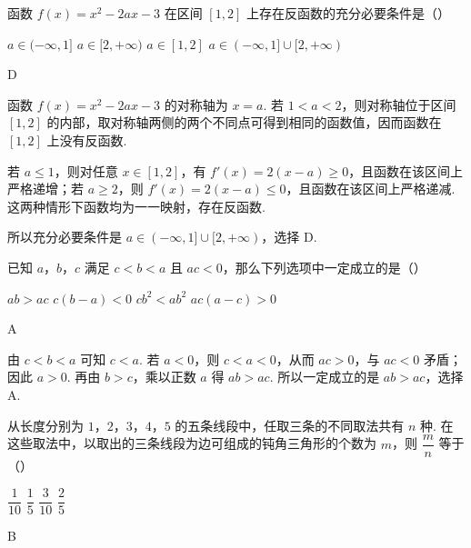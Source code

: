 \begin{problem}
函数 \(f(x)=x^2-2ax-3\) 在区间 \([1,2]\) 上存在反函数的充分必要条件是（\quad）

\choices
    {\(a\in(-\infty,1]\)}
    {\(a\in[2,+\infty)\)}
    {\(a\in[1,2]\)}
    {\(a\in(-\infty,1]\cup[2,+\infty)\)}
\end{problem}

\begin{answer}
D
\end{answer}

\begin{solution}
函数 \(f(x)=x^2-2ax-3\) 的对称轴为 \(x=a\). 若 \(1<a<2\)，则对称轴位于区间 \([1,2]\) 的内部，取对称轴两侧的两个不同点可得到相同的函数值，因而函数在 \([1,2]\) 上没有反函数.

若 \(a\leqslant1\)，则对任意 \(x\in[1,2]\)，有 \(f'(x)=2(x-a)\geqslant0\)，且函数在该区间上严格递增；若 \(a\geqslant2\)，则 \(f'(x)=2(x-a)\leqslant0\)，且函数在该区间上严格递减. 这两种情形下函数均为一一映射，存在反函数.

所以充分必要条件是 \(a\in(-\infty,1]\cup[2,+\infty)\)，选择 D.
\end{solution}

\begin{problem}
已知 \(a\)，\(b\)，\(c\) 满足 \(c<b<a\) 且 \(ac<0\)，那么下列选项中一定成立的是（\quad）

\choices
    {\(ab>ac\)}
    {\(c(b-a)<0\)}
    {\(cb^2<ab^2\)}
    {\(ac(a-c)>0\)}
\end{problem}

\begin{answer}
A
\end{answer}

\begin{solution}
由 \(c<b<a\) 可知 \(c<a\). 若 \(a<0\)，则 \(c<a<0\)，从而 \(ac>0\)，与 \(ac<0\) 矛盾；因此 \(a>0\). 再由 \(b>c\)，乘以正数 \(a\) 得
\(ab>ac\).
所以一定成立的是 \(ab>ac\)，选择 A.
\end{solution}

\begin{problem}
从长度分别为 \(1\)，\(2\)，\(3\)，\(4\)，\(5\) 的五条线段中，任取三条的不同取法共有 \(n\) 种. 在这些取法中，以取出的三条线段为边可组成的钝角三角形的个数为 \(m\)，则 \(\dfrac{m}{n}\) 等于（\quad）

\choices
    {\(\dfrac{1}{10}\)}
    {\(\dfrac{1}{5}\)}
    {\(\dfrac{3}{10}\)}
    {\(\dfrac{2}{5}\)}
\end{problem}

\begin{answer}
B
\end{answer}

